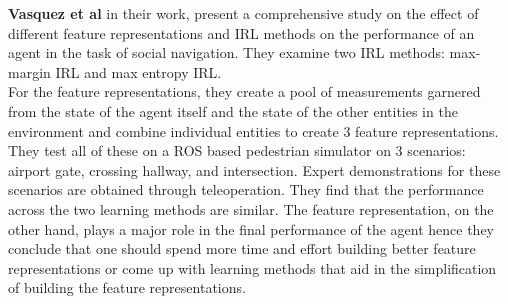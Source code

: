 \textbf{Vasquez et al} in their work, present a comprehensive study on the effect of different feature representations and IRL methods on the performance of an agent in the task of social navigation. They examine two IRL methods:
max-margin IRL and max entropy IRL.\\
For the feature representations, they create a pool of measurements garnered from the state of the agent itself and the state of the other entities in the environment and combine individual entities to create 3 feature representations. \\
They test all of these on a ROS based pedestrian simulator on 3 scenarios: airport gate, crossing hallway, and intersection. Expert demonstrations for these scenarios are obtained through teleoperation. They find that the performance across the two learning methods are similar. The feature representation, on the other hand, plays a major role in the final performance of the agent hence they conclude that one should spend more time and effort building better feature representations or come up with learning methods that aid in the simplification of building the feature representations.\\

